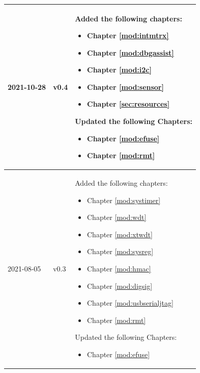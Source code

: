 \begin{longtable}[l]{ | m{2cm} | m{1.5cm} | m{12cm} | }
        2021-10-28      & v0.4 &
        Added the following chapters:
            \begin{itemize}
                \item Chapter \ref{mod:intmtrx} \textit{\nameref{mod:intmtrx}}
                \item Chapter \ref{mod:dbgassist} \textit{\nameref{mod:dbgassist}}
                \item Chapter \ref{mod:i2c} \textit{\nameref{mod:i2c}}
                \item Chapter \ref{mod:sensor} \textit{\nameref{mod:sensor}}
                \item Chapter \ref{sec:resources} \textit{\nameref{sec:resources}}
            \end{itemize}
        Updated the following Chapters:
            \begin{itemize}
                \item Chapter \ref{mod:efuse} \textit{\nameref{mod:efuse}}
                \item Chapter \ref{mod:rmt} \textit{\nameref{mod:rmt}}
            \end{itemize} \\\hline
        2021-08-05 & v0.3 &
        Added the following chapters:
            \begin{itemize}
                \item Chapter \ref{mod:systimer} \textit{\nameref{mod:systimer}}
                \item Chapter \ref{mod:wdt} \textit{\nameref{mod:wdt}}
                \item Chapter \ref{mod:xtwdt} \textit{\nameref{mod:xtwdt}}
                \item Chapter \ref{mod:sysreg} \textit{\nameref{mod:sysreg}}
                \item Chapter \ref{mod:hmac} \textit{\nameref{mod:hmac}}
                \item Chapter \ref{mod:digsig} \textit{\nameref{mod:digsig}}
                \item Chapter \ref{mod:usbserialjtag} \textit{\nameref{mod:usbserialjtag}}
                \item Chapter \ref{mod:rmt} \textit{\nameref{mod:rmt}}
            \end{itemize}
        Updated the following Chapters:
            \begin{itemize}
                \item Chapter \ref{mod:efuse} \textit{\nameref{mod:efuse}}

\end{itemize}
\end{longtable}
